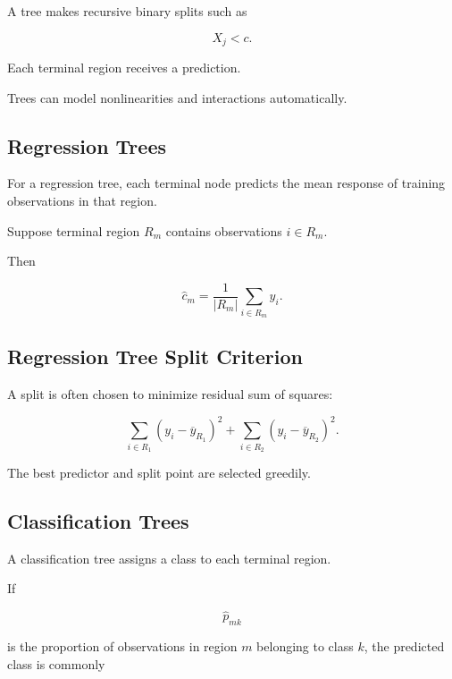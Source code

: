 A tree makes recursive binary splits such as

\[
\boxed{
X_j<c.
}
\]

Each terminal region receives a prediction.

Trees can model nonlinearities and interactions automatically.

\subsection{Regression Trees}
\label{subsec:regression-trees}

For a regression tree, each terminal node predicts the mean response of
training observations in that region.

Suppose terminal region \(R_m\) contains observations \(i\in R_m\).

Then

\[
\boxed{
\widehat{c}_m
=
\frac1{|R_m|}
\sum_{i\in R_m}
y_i.
}
\]

\subsection{Regression Tree Split Criterion}
\label{subsec:regression-tree-split}

A split is often chosen to minimize residual sum of squares:

\[
\boxed{
\sum_{i\in R_1}
(
y_i-\overline{y}_{R_1}
)^2
+
\sum_{i\in R_2}
(
y_i-\overline{y}_{R_2}
)^2.
}
\]

The best predictor and split point are selected greedily.

\subsection{Classification Trees}
\label{subsec:classification-trees}

A classification tree assigns a class to each terminal region.

If

\[
\widehat{p}_{mk}
\]

is the proportion of observations in region \(m\) belonging to class
\(k\), the predicted class is commonly

